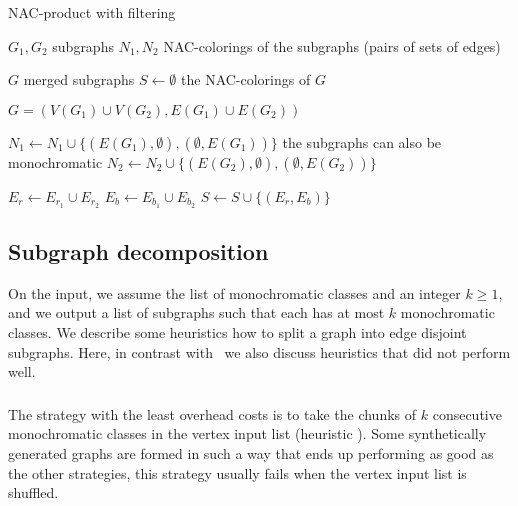 \begin{algorithm}
	\caption{NAC-product with filtering}%
	\label{alg:coloring_product}
	\begin{algorithmic}[1]
		\Require{} $G_1, G_2$
		\Comment{} subgraphs
		\Require{} $N_1, N_2$
		\Comment{} NAC-colorings of the subgraphs (pairs of sets of edges)

		\Ensure{} $G$
		\Comment{} merged subgraphs
		\Ensure{} $S \gets \emptyset$
		\Comment{} the NAC-colorings of $G$

		\State{} $G = (V(G_1)\cup V(G_2), E(G_1) \cup E(G_2))$

		\State{} $N_1 \gets N_1 \cup \{(E(G_1), \emptyset), (\emptyset, E(G_1))\}$
		\Comment{} the subgraphs can also be monochromatic
		\State{} $N_2 \gets N_2 \cup \{(E(G_2), \emptyset), (\emptyset, E(G_2))\}$

		\State{} $E_r \gets E_{r_{1}} \cup E_{r_{2}}$
		\State{} $E_b \gets E_{b_{1}} \cup E_{b_{2}}$
		\State{} $S \gets S \cup \{(E_r, E_b)\}$
		\EndIf{}
		\EndFor{}
		\EndFor{}
	\end{algorithmic}
\end{algorithm}

\subsection{Subgraph decomposition}%
\label{sec:decomposition}

On the input, we assume the list of monochromatic classes
and an integer $k\geq 1$, and we output a list of subgraphs
such that each has at most $k$ monochromatic classes.
We describe some heuristics how to split a graph into edge disjoint subgraphs.
Here, in contrast with~\cite{my_paper} we also discuss heuristics
that did not perform well.

\subsubsection{\None{}}

The strategy with the least overhead costs is to take the chunks of $k$ consecutive
monochromatic classes in the vertex input list (heuristic \None{}).
Some synthetically generated graphs are formed in such a way
that \None{} ends up performing as good as the other strategies,
this strategy usually fails when the vertex input list is shuffled.

